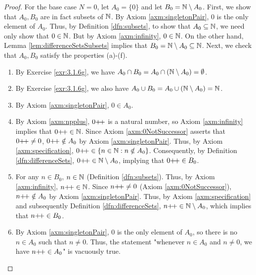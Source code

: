 \documentclass[../main.tex]{subfiles}
\begin{document}
\begin{enumerate}[ref={\thesection.\arabic*}]
\begin{proof}
        For the base case $N=0$, let $A_0=\{0\}$ and let $B_0=\mathbb{N}\setminus A_0$. First, we show that $A_0,B_0$ are in fact subsets of $\mathbb{N}$. By Axiom \ref{axm:singletonPair}, 0 is the only element of $A_0$. Thus, by Definition \ref{dfn:subsets}, to show that $A_0\subseteq\mathbb{N}$, we need only show that $0\in\mathbb{N}$. But by Axiom \ref{axm:infinity}, $0\in\mathbb{N}$. On the other hand, Lemma \ref{lem:differenceSetsSubsets} implies that $B_0=\mathbb{N}\setminus A_0\subseteq\mathbb{N}$. Next, we check that $A_0,B_0$ satisfy the properties (a)-(f).
        \begin{enumerate}
            \item By Exercise \ref{exr:3.1.6g}, we have $A_0\cap B_0=A_0\cap(\mathbb{N}\setminus A_0)=\emptyset$.
            \item By Exercise \ref{exr:3.1.6g}, we also have $A_0\cup B_0=A_0\cup(\mathbb{N}\setminus A_0)=\mathbb{N}$.
            \item By Axiom \ref{axm:singletonPair}, $0\in A_0$.
            \item By Axiom \ref{axm:npplus}, $0{+\!+}$ is a natural number, so Axiom \ref{axm:infinity} implies that $0{+\!+}\in\mathbb{N}$. Since Axiom \ref{axm:0NotSuccessor} asserts that $0{+\!+}\neq 0$, $0{+\!+}\notin A_0$ by Axiom \ref{axm:singletonPair}. Thus, by Axiom \ref{axm:specification}, $0{+\!+}\in\{n\in\mathbb{N}:n\notin A_0\}$. Consequently, by Definition \ref{dfn:differenceSets}, $0{+\!+}\in\mathbb{N}\setminus A_0$, implying that $0{+\!+}\in B_0$.
            \item For any $n\in B_0$, $n\in\mathbb{N}$ (Definition \ref{dfn:subsets}). Thus, by Axiom \ref{axm:infinity}, $n{+\!+}\in\mathbb{N}$. Since $n{+\!+}\neq 0$ (Axiom \ref{axm:0NotSuccessor}), $n{+\!+}\notin A_0$ by Axiom \ref{axm:singletonPair}. Thus, by Axiom \ref{axm:specification} and subsequently Definition \ref{dfn:differenceSets}, $n{+\!+}\in\mathbb{N}\setminus A_0$, which implies that $n{+\!+}\in B_0$.
            \item By Axiom \ref{axm:singletonPair}, 0 is the only element of $A_0$, so there is no $n\in A_0$ such that $n\neq 0$. Thus, the statement "whenever $n\in A_0$ and $n\neq 0$, we have $n{+\!+}\in A_0$" is vacuously true.
        \end{enumerate}

\end{proof}
\end{enumerate}
\end{document}
